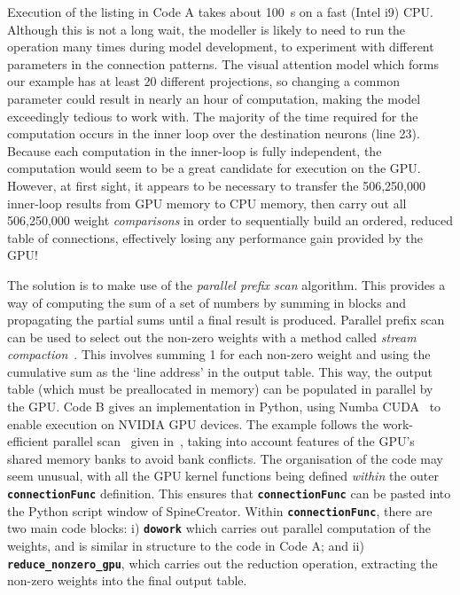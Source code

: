 \documentclass[12pt, a4paper]{article}
\newcommand{\code}[1]{\textbf{\texttt{#1}}}
\begin{document}
Execution of the listing in Code A takes about 100~s on a fast (Intel i9)
CPU. Although this is not a long wait, the modeller is likely to need to run
the operation many times during model development, to experiment with
different parameters in the connection patterns. The visual attention model
which forms our example has at least 20 different projections, so changing a
common parameter could result in nearly an hour of computation, making the
model exceedingly tedious to work with.  The majority of the time required for
the computation occurs in the inner loop over the destination neurons (line
23). Because each computation in the inner-loop is fully independent, the
computation would seem to be a great candidate for execution on the
GPU. However, at first sight, it appears to be necessary to transfer the
506,250,000 inner-loop results from GPU memory to CPU memory, then carry out
all 506,250,000 weight
\emph{comparisons} in order to sequentially build an ordered, reduced table of
connections, effectively losing any performance gain provided by the GPU!

The solution is to make use of the \emph{parallel prefix scan}
algorithm\cite{blelloch_prefix_1990}. This provides a way of computing the sum
of a set of numbers by summing in blocks and propagating the partial sums
until a final result is produced. Parallel prefix scan can be used to select
out the non-zero weights with a method called \emph{stream
compaction}~\cite{harris_chapter_2010}. This involves summing 1 for each
non-zero weight and using the cumulative sum as the `line address' in the
output table. This way, the output table (which must be preallocated in
memory) can be populated in parallel by the GPU. Code B gives an
implementation in Python, using Numba CUDA~\cite{anaconda_inc_numba_2012} to
enable execution on NVIDIA GPU devices. The example follows the work-efficient
parallel scan~\cite{blelloch_prefix_1990} given in~\cite{harris_chapter_2010},
taking into account features of the GPU's shared memory banks to avoid bank
conflicts. The organisation of the code may seem unusual, with all the GPU
kernel functions being defined \emph{within} the outer \code{connectionFunc}
definition. This ensures that
\code{connectionFunc} can be pasted into the Python script window of
SpineCreator. Within \code{connectionFunc}, there are two main code blocks:
i) \code{dowork} which carries out parallel computation of the weights, and is
similar in structure to the code in Code A; and
ii) \code{reduce\_nonzero\_gpu}, which carries out the reduction operation,
extracting the non-zero weights into the final output table.
\end{document}
